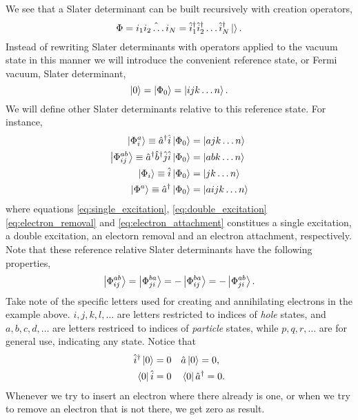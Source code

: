 		We see that a Slater determinant can be built recursively with creation operators,
		\begin{equation}
			\Phi = \hat{i_1i_2\dots i_N} 
				= \hat{i}_1^\dagger \hat{i}_2^\dagger \dots \hat{i}_N^\dagger\ket{}.
		\end{equation}
		Instead of rewriting Slater determinants with operators applied to the vacuum 
		state in this manner we will introduce the convenient reference state, or 
		Fermi vacuum, Slater determinant,
		\begin{equation}
			\ket{0} = \ket{\Phi_0} = \ket{ijk\dots n}. 
		\end{equation}
		We will define other Slater determinants relative to this reference state.
		For instance,
		\begin{align}
		\label{eq:single_excitation}
		\ket{\Phi^a_i} \equiv \hat{a}^\dagger \hat{i}\ket{\Phi_0} &= \ket{ajk\dots n} \\
		\label{eq:double_excitation}
		\ket{\Phi^{ab}_{ij}} \equiv \hat{a}^\dagger\hat{b}^\dagger \hat{j} \hat{i}\ket{\Phi_0}
			&= \ket{abk\dots n} \\
		\label{eq:electron_removal}
		\ket{\Phi_i} \equiv \hat{i}\ket{\Phi_0} &= \ket{jk\dots n} \\
		\label{eq:electron_attachment}
		\ket{\Phi^a} \equiv \hat{a}^\dagger \ket{\Phi_0} &= \ket{aijk\dots n}
		\end{align}
		where equations \ref{eq:single_excitation}, \ref{eq:double_excitation}
		\ref{eq:electron_removal} and \ref{eq:electron_attachment}
		constitues a single excitation, a double excitation, an electorn removal and an
		electron attachment, respectively. Note that these reference relative Slater 
		determinants have the following properties,
		\begin{equation}
			\ket{\Phi^{ab}_{ij}} = \ket{\Phi^{ba}_{ji}}
				= - \ket{\Phi^{ba}_{ij}} = - \ket{\Phi^{ab}_{ji}}.
		\end{equation}
		Take note of the specific letters used for creating and annihilating electrons 
		in the example above. $i,j,k,l,\dots$ are letters restricted to indices of 
		\emph{hole} states, and $a,b,c,d,\dots$ are letters restriced to indices of
		\emph{particle} states, while $p,q,r,\dots$ are for general use, indicating 
		any state. Notice that
		\begin{equation}
			\begin{aligned}
				\hat{i}^\dagger\ket{0} = 0 &\quad \hat{a}\ket{0} = 0, \\
				\bra{0}\hat{i} = 0 &\quad \bra{0}\hat{a}^\dagger = 0.
			\end{aligned}	
		\end{equation}
		Whenever we try to insert an electron where there already is one, or when we 
		try to remove an electron that is not there, we get zero as result.

